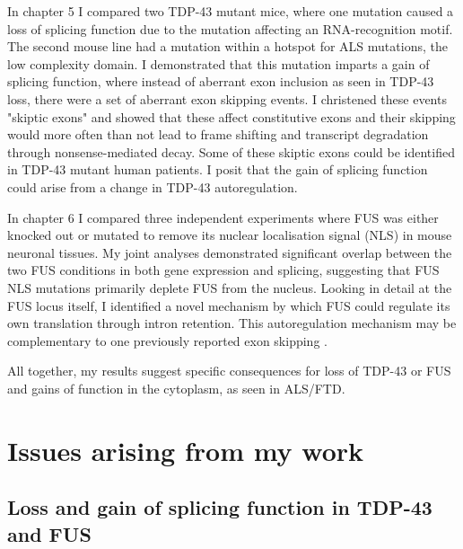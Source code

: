 In chapter 5 I compared two TDP-43 mutant mice, where one mutation caused a loss of splicing function due to the mutation affecting an RNA-recognition motif. 
The second mouse line had a mutation within a hotspot for ALS mutations, the low complexity domain.
I demonstrated that this mutation imparts a gain of splicing function, where instead of aberrant exon inclusion as seen in TDP-43 loss, there were a set of aberrant exon skipping events.
I christened these events "skiptic exons" and showed that these affect constitutive exons and their skipping would more often than not lead to frame shifting and transcript degradation through nonsense-mediated decay. 
Some of these skiptic exons could be identified in TDP-43 mutant human patients.
I posit that the gain of splicing function could arise from a change in TDP-43 autoregulation.

In chapter 6 I compared three independent experiments where FUS was either knocked out or mutated to remove its nuclear localisation signal (NLS) in mouse neuronal tissues.
My joint analyses demonstrated significant overlap between the two FUS conditions in both gene expression and splicing, suggesting that FUS NLS mutations primarily deplete FUS from the nucleus.
Looking in detail at the FUS locus itself, I identified a novel mechanism by which FUS could regulate its own translation through intron retention. 
This autoregulation mechanism may be complementary to one previously reported exon skipping \citep{Zhou2013}.

All together, my results suggest specific consequences for loss of TDP-43 or FUS and gains of function in the cytoplasm, as seen in ALS/FTD.

\section{Issues arising from my work}

\subsection{Loss and gain of splicing function in TDP-43 and FUS}


